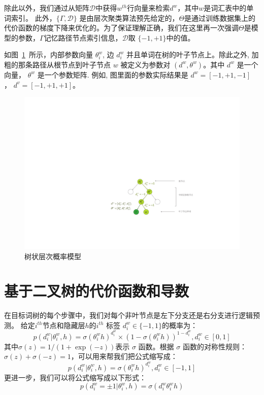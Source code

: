 除此以外，我们通过从矩阵$\mathcal{D}$中获得$w^{th} $行向量来检索$d^w$，其中$w$是词汇表中的单词索引。 此外，$\{\Gamma,\mathcal{D}\}$ 是由层次聚类算法预先给定的，$\Theta$是通过训练数据集上的代价函数的梯度下降来优化的。为了保证理解正确，我们在这里再一次强调$ \Theta $是模型的参数，$ \Gamma $记忆路径节点索引信息，$\mathcal {D}$取 $ \{ - 1,+1 \} $中的值。

如图~\ref{fig:tree_hsm}~所示，内部参数向量 $\theta_i^w$, 边 $d_i^w$ 并且单词在树的叶子节点上。除此之外, 加粗的那条路径从根节点到叶子节点 $w$ 被定义为参数对 $(d^w,\theta^w)$。其中 $d^w$ 是一个向量， $\theta^w$ 是一个参数矩阵. 例如, 图里面的参数实际结果是 $d^w=[-1,+1,-1]$ ， $d^{v}=[-1,+1,+1]$。
\begin{figure}[!h]
  \centering
    \includegraphics[width=0.9\linewidth]{./figures/thsm.pdf}
\caption{树状层次概率模型}\label{fig:tree_hsm} %
\end{figure}

\section{基于二叉树的代价函数和导数}
在目标词树的每个步骤中，我们对每个非叶节点是左下分支还是右分支进行逻辑预测。 给定$ i^{th} $节点和隐藏层$ h $的$ i^{th} $ 标签 $d^w_i\in \{-1,1\}$的概率为：
 \begin{equation}
p(d^w_i|\theta_{i}^w,h) =\sigma(\theta_{i}^w h)^{d_i^w}\times(1-\sigma(\theta_{i}^w h))^{1-{d_i^w}},d_i^w \in [0,1]
\end{equation}
其中$ \sigma(z)= 1 /(1 + \exp(-z))$表示 $\sigma$ 函数。根据 $\sigma$ 函数的对称性规则：$\sigma(z)+ \sigma(-z)=1 $，可以用来帮我们把公式缩写成：
 \begin{equation}
p(d^w_i|\theta_{i}^w,h) =\sigma(\theta_{i}^w h)^{d_i^w}, d_i^w \in [-1,1]
\end{equation}
更进一步，我们可以将公式缩写成以下形式：
\begin{equation}
p(d^w_i=\pm 1|\theta_{i}^w,h) = \sigma({d_i^w}\theta_{i}^w h)
\end{equation}



